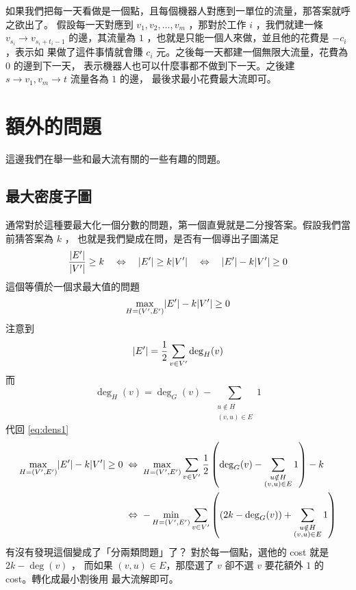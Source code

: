 \documentclass[a4paper,12pt]{book}
\begin{document}
如果我們把每一天看做是一個點，且每個機器人對應到一單位的流量，那答案就呼之欲出了。
假設每一天對應到 $v_1, v_2, \dots, v_m$ ，那對於工作 $i$ ，我們就建一條 $v_{s_i} \rightarrow 
v_{s_i+t_i-1}$ 的邊，其流量為 $1$ ，也就是只能一個人來做，並且他的花費是 $-c_i$，表示如
果做了這件事情就會賺 $c_i$ 元。之後每一天都建一個無限大流量，花費為 $0$ 的邊到下一天，
表示機器人也可以什麼事都不做到下一天。之後建 $s \rightarrow v_1, v_{m} \rightarrow t$ 
流量各為 $1$ 的邊， 最後求最小花費最大流即可。

\section{額外的問題}
這邊我們在舉一些和最大流有關的一些有趣的問題。

\subsection{最大密度子圖}

通常對於這種要最大化一個分數的問題，第一個直覺就是二分搜答案。假設我們當前猜答案為 $k$ ，
也就是我們變成在問，是否有一個導出子圖滿足
\[ \frac{\lvert E' \rvert}{\lvert V' \rvert} \geq k \quad \Leftrightarrow \quad \lvert E' \rvert \geq k \lvert V' \rvert 
  \quad \Leftrightarrow \quad \lvert E' \rvert - k \lvert V' \rvert \geq 0 \]
這個等價於一個求最大值的問題
\begin{equation}
\max_{H = (V', E')} \lvert E' \rvert - k \lvert V' \rvert \geq 0
\label{eq:dens1}
\end{equation}
注意到
\[ \lvert E' \rvert = \frac{1}{2} \sum_{v \in V'} \deg_H(v)  \]
而
\[ \deg_H(v) = \deg_G(v) - \sum_{\substack{u \notin H \\ (v, u) \in E}} 1 \]
代回 \eqref{eq:dens1} 
\begin{align*}
  \max_{H = (V', E')} \lvert E' \rvert - k \lvert V' \rvert \geq 0 \; & \Leftrightarrow \;
  \max_{H = (V', E')} \sum_{v \in V'} \frac{1}{2} \left( \deg_G(v) -
      \sum_{\substack{u \notin H \\ (v, u) \in E}} 1 \right) - k \\
    & \Leftrightarrow \; - \min_{H = (V', E')} \sum_{v \in V'} \left( \left(2k - \deg_G(v) \right) +
      \sum_{\substack{u \notin H \\ (v, u) \in E}} 1 \right) \\
\end{align*}
有沒有發現這個變成了「分兩類問題」了？ 對於每一個點，選他的 cost 就是 $2k - \deg(v)$ ，
而如果 $(v, u) \in E$，那麼選了 $v$ 卻不選 $v$ 要花額外 $1$ 的 cost。轉化成最小割後用
最大流解即可。
\end{document}
